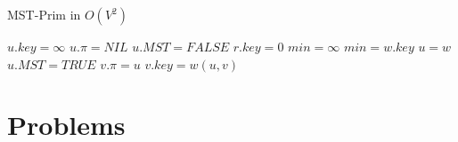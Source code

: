 \documentclass{book}
\begin{document}
	\begin{algorithm}[h!]
		\caption{MST-Prim in $O(V^2)$}
		\begin{algorithmic}[1]
					\State $u.key = \infty$
					\State $u.\pi = NIL$
					\State $u.MST = FALSE$
				\EndFor
				\State $r.key = 0$
					\State $min = \infty$
							\State $min = w.key$
							\State $u = w$
						\EndIf
					\EndFor
					\State $u.MST = TRUE$
							\State $v.\pi = u$
							\State $v.key = w(u, v)$
						\EndIf
					\EndFor
				\EndFor
			\EndFunction
		\end{algorithmic}
	\end{algorithm}
	\FloatBarrier	
	\section{Problems}
\end{document}
